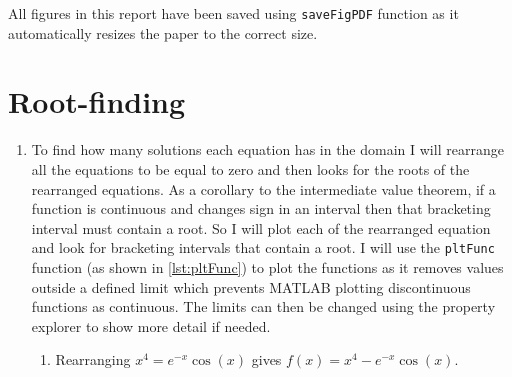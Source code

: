 \documentclass[a4paper,11pt]{article}
\begin{document}

\tableofcontents

\hfill \break

All figures in this report have been saved using \verb*|saveFigPDF| function 
as it automatically resizes the paper to the correct size.

\section{Root-finding}
\begin{enumerate}
	\item To find how many solutions each equation has in the domain  I 
	will rearrange all the equations to be equal to zero and then looks for 
	the roots of the rearranged equations. As a corollary to the intermediate 
	value theorem, if a function is continuous and changes sign in an 
	interval 
	then that bracketing interval must contain a root. So I will plot each of 
	the 
	rearranged equation and look for bracketing intervals that contain a 
	root. I will use the 
	\verb*|pltFunc| function (as shown in \autoref{lst:pltFunc}) to plot the 
	functions as it removes values 
	outside a defined limit which prevents MATLAB plotting discontinuous 
	functions as continuous. The limits can then be changed using the 
	property explorer to show more detail if needed.
	\begin{enumerate}
		\item Rearranging $x^{4} = e^{-x} \cos(x)$ gives $f(x) = x^{4} - 
		e^{-x} \cos(x)$.
		
\end{enumerate}
\end{enumerate}
\end{document}
